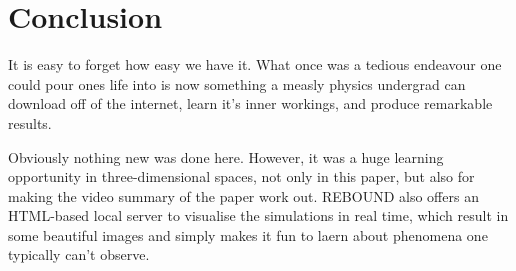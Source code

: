 \section{Conclusion}

It is easy to forget how easy we have it. What once was a tedious endeavour one could pour ones life into is now something a measly physics undergrad can download off of the internet, learn it's inner workings, and produce remarkable results.

Obviously nothing new was done here. However, it was a huge learning opportunity in three-dimensional spaces, not only in this paper, but also for making the video summary of the paper work out. REBOUND also offers an HTML-based local server to visualise the simulations in real time, which result in some beautiful images and simply makes it fun to laern about phenomena one typically can't observe.
